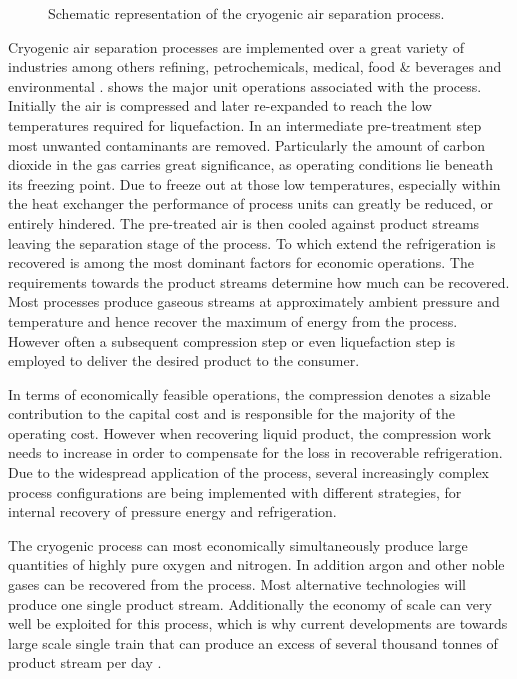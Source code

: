         \begin{figure}
            \center
            
            \caption[Air Separation Unit]{Schematic representation of the cryogenic air separation process.}
            \label{fig:ASU}
        \end{figure}
        Cryogenic air separation processes are implemented over a great variety of industries among others refining,
        petrochemicals, medical, food \& beverages and environmental \cite{Sirdeshpande.2005}. 
        shows the major unit operations associated with the process. Initially the air is compressed and later re-expanded
        to reach the low temperatures required for liquefaction. In an intermediate pre-treatment step most unwanted
        contaminants are removed. Particularly the amount of carbon dioxide in the gas carries great significance, as
        operating conditions lie beneath its freezing point. Due to freeze out at those low temperatures, especially
        within the heat exchanger the performance of process units can greatly be reduced, or entirely hindered.
        The pre-treated air is then cooled against product streams leaving the separation stage of the process. To which extend
        the refrigeration is  recovered is among the most dominant factors for economic operations. The requirements
        towards the product streams determine how much can be recovered. Most processes produce gaseous streams at
        approximately ambient pressure and temperature \cite{Smith.2001} and hence recover the maximum of energy from the
        process. However often a subsequent compression step or even liquefaction step is employed to deliver the
        desired product to the consumer.
    
        In terms of economically feasible operations, the compression denotes a sizable contribution to the capital cost
        and is responsible for the majority of the operating cost. However when recovering liquid product, the
        compression work needs to increase in order to compensate for the loss in recoverable refrigeration. Due to the widespread
        application of the  process, several increasingly complex process configurations are being implemented
        with different strategies, for internal recovery of pressure energy and refrigeration.
    
        The cryogenic process can most economically simultaneously produce large quantities of highly pure oxygen and nitrogen.
        In addition argon and other noble gases can be recovered from the process. Most alternative technologies will
        produce one single product stream. Additionally the economy of scale can very well be exploited for this
        process, which is why current developments are towards large scale single train that can produce
        an excess of several thousand tonnes of product stream per day \cite{Castle.2002}.
    
